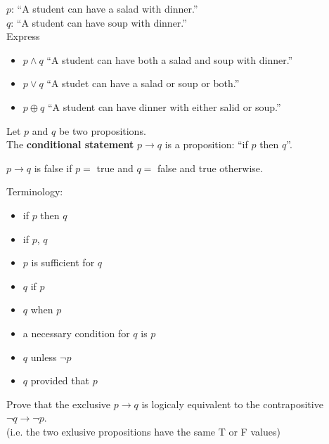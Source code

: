 \documentclass[a4paper, 12pt]{article}
\newenvironment{proof}[1][Proof]{\begin{trivlist}
\item[\hskip \labelsep {\bfseries #1}]}{\end{trivlist}}
\newenvironment{definition}[1][Definition]{\begin{trivlist}
\item[\hskip \labelsep {\bfseries #1}]}{\end{trivlist}}
\newenvironment{example}[1][Example]{\begin{trivlist}
\item[\hskip \labelsep {\bfseries #1}]}{\end{trivlist}}
\newenvironment{remark}[1][Remark]{\begin{trivlist}
\item[\hskip \labelsep {\bfseries #1}]}{\end{trivlist}}
\newcommand{\keyword}[1]{\textbf{#1}}
\begin{document}
    \begin{example}
        \hfill \break
        $p$: ``A student can have a salad with dinner.''\\
        $q$: ``A student can have soup with dinner.''\\
        Express
        \begin{itemize}
            \item $p \wedge q$ ``A student can have both a salad
            and soup with dinner.''
            \item $p \vee q$ ``A studet can have a salad or soup or
            both.''
            \item $p \oplus q$ ``A student can have dinner with
            either salid or soup.''
        \end{itemize}
    \end{example}
    \begin{definition}
        Let $p$ and $q$ be two propositions.\\
        The \keyword{conditional statement} $p \rightarrow q$ is a
        proposition: ``if $p$ then $q$''.
    \end{definition}
    \begin{remark}
        $p \rightarrow q$ is false if $p =$ true and $q =$ false and
        true otherwise.
    \end{remark}
    \begin{remark}
        Terminology:
        \begin{itemize}
            \item if $p$ then $q$
            \item if $p$, $q$
            \item $p$ is sufficient for $q$
            \item $q$ if $p$
            \item $q$ when $p$
            \item a necessary condition for $q$ is $p$
            \item $q$ unless $\neg p$
            \item $q$ provided that $p$
        \end{itemize}
    \end{remark}
    \begin{proof}
        Prove that the exclusive $p \rightarrow q$ is logicaly equivalent
        to the contrapositive $\neg q \rightarrow \neg p$.\\
        (i.e. the two exlusive propositions have the same T or F values)
    \end{proof}
\end{document}
